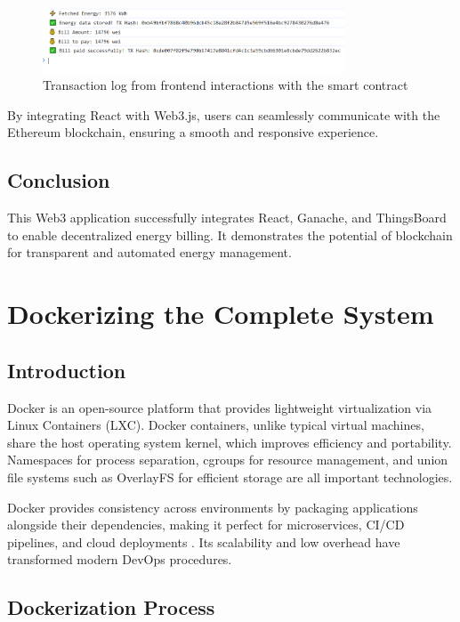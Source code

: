 \documentclass[a4paper,12pt]{report}
\begin{document}
\begin{figure}[H]
\centering
\includegraphics[width=0.8\textwidth]{frontend Logs.PNG}
\caption{Transaction log from frontend interactions with the smart contract}
\label{fig:frontend_transactions}
\end{figure}

By integrating React with Web3.js, users can seamlessly communicate with the Ethereum blockchain, ensuring a smooth and responsive experience.
 
 \section{Conclusion}
 This Web3 application successfully integrates React, Ganache, and ThingsBoard to enable decentralized energy billing. It demonstrates the potential of blockchain for transparent and automated energy management.

\chapter{Dockerizing the Complete System}
\section{Introduction}
Docker is an open-source platform that provides lightweight virtualization via Linux Containers (LXC). Docker containers, unlike typical virtual machines, share the host operating system kernel, which improves efficiency and portability. Namespaces for process separation, cgroups for resource management, and union file systems such as OverlayFS for efficient storage are all important technologies.

Docker provides consistency across environments by packaging applications alongside their dependencies\cite{dana2011}, making it perfect for microservices, CI/CD pipelines, and cloud deployments \cite{marzolla2011}.  Its scalability and low overhead have transformed modern DevOps procedures\cite{zhang2011}.

\section{Dockerization Process}
\end{document}
